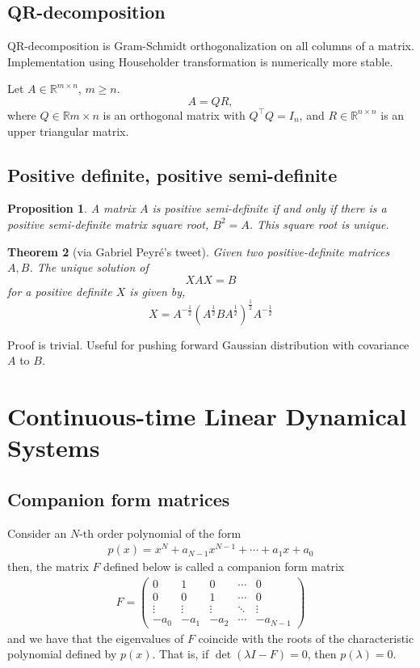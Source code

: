 \documentclass[a4paper,11pt]{exam}
\newtheorem{theorem}{Theorem}
\newtheorem{proposition}[theorem]{Proposition}
\newcounter{ct}
\newcommand{\tp}[1]{\ensuremath{{#1}^\top}} %
\newcommand{\field}[1]{\ensuremath{\mathbb{#1}}}
\newcommand{\reals}{\field{R}}
\newcommand{\onehalf}{\frac{1}{2}}
\begin{document}
\subsection{QR-decomposition}
QR-decomposition is Gram-Schmidt orthogonalization on all columns of a matrix.
Implementation using Householder transformation is numerically more stable.

Let $A \in \reals^{m \times n}$, $m \geq n$.
\[
    A = QR,
\]
where $Q \in \reals{m \times n}$ is an orthogonal matrix with $\tp{Q}Q = I_n$,
and $R \in \reals^{n \times n}$ is an upper triangular matrix.

\subsection{Positive definite, positive semi-definite}
\begin{proposition}
    A matrix $A$ is positive semi-definite if and only if there is a positive semi-definite matrix square root, $B^2 = A$. This square root is unique.
\end{proposition}

\begin{theorem}[via Gabriel Peyr\'e's tweet]
    Given two positive-definite matrices $A, B$. The unique solution of
    \[
	XAX=B
    \]
    for a positive definite $X$ is given by,
    \[
	X = A^{-\onehalf} \left( A^\onehalf B A^\onehalf \right)^\onehalf A^{-\onehalf}
    \]
\end{theorem}
Proof is trivial. Useful for pushing forward Gaussian distribution with covariance $A$ to $B$.


\section{Continuous-time Linear Dynamical Systems}
\subsection{Companion form matrices}
Consider an $N\text{-th}$ order polynomial of the form
\begin{align}
    p(x) = x^N + a_{N-1} x^{N-1} + \cdots + a_1 x + a_0
\end{align}
then, the matrix $F$ defined below is called a companion form matrix
\begin{align}
    F = \begin{pmatrix} 0 & 1 & 0 & \cdots & 0\\
                        0 & 0 & 1 & \cdots & 0\\
                        \vdots & \vdots & \vdots & \ddots & \vdots\\
                        -a_0 & -a_1 & -a_2 & \cdots & -a_{N-1}\end{pmatrix}
\end{align}
and we have that the eigenvalues of $F$ coincide with the roots of the characteristic polynomial defined by $p(x)$.  That is, if $\det(\lambda I - F) = 0$, then $p(\lambda) = 0$.  
\end{document}
